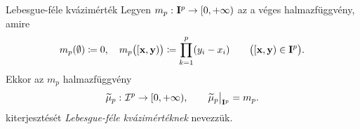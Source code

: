 \documentclass[
]{elteikthesis}[2024/04/26]
\begin{document}
	\begin{definition}{Lebesgue-féle kvázimérték}{}
		Legyen \( m_p  \,\colon  \mathbf{I}^p  \to [0, +\infty) \) az a véges halmazfüggvény, amire
		\[
			m_p( \emptyset ) \coloneq 0, \quad
			m_p \bigl( [\vb{x}, \vb{y}) \bigr) \coloneq \prod_{k=1}^{p} (y_i - x_i) 
			\qquad \bigl( [\vb{x}, \vb{y}) \in \mathbf{I}^p \bigr).
		\]
		Ekkor az \( m_p \) halmazfüggvény
		\[
			\func{ \widetilde{\mu}_p }{ \mathcal{I}^p }{[0, +\infty)}, \qquad
			\restr{ \widetilde{\mu}_p }{ \mathbf{I}^p } = m_p.
		\]
		kiterjesztését \emph{Lebesgue-féle kvázimértéknek} nevezzük.
	\end{definition}
	
\end{document}
